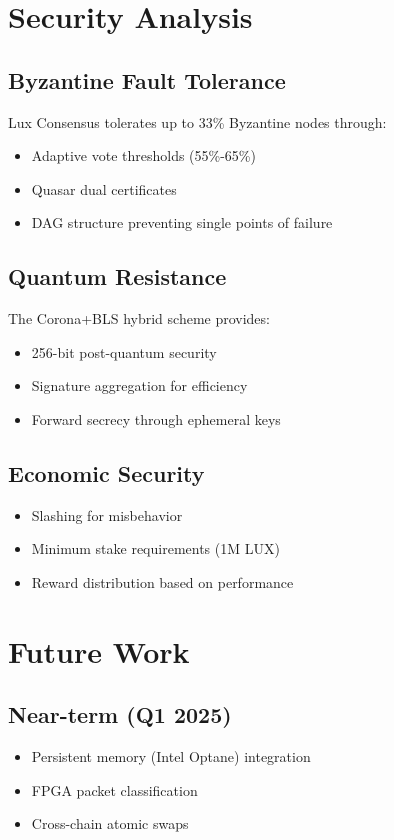 \documentclass[11pt,a4paper]{article}
\begin{document}
\section{Security Analysis}

\subsection{Byzantine Fault Tolerance}

Lux Consensus tolerates up to 33\% Byzantine nodes through:
\begin{itemize}
    \item Adaptive vote thresholds (55\%-65\%)
    \item Quasar dual certificates
    \item DAG structure preventing single points of failure
\end{itemize}

\subsection{Quantum Resistance}

The Corona+BLS hybrid scheme provides:
\begin{itemize}
    \item 256-bit post-quantum security
    \item Signature aggregation for efficiency
    \item Forward secrecy through ephemeral keys
\end{itemize}

\subsection{Economic Security}

\begin{itemize}
    \item Slashing for misbehavior
    \item Minimum stake requirements (1M LUX)
    \item Reward distribution based on performance
\end{itemize}

\section{Future Work}

\subsection{Near-term (Q1 2025)}
\begin{itemize}
    \item Persistent memory (Intel Optane) integration
    \item FPGA packet classification
    \item Cross-chain atomic swaps
\end{itemize}
\end{document}
